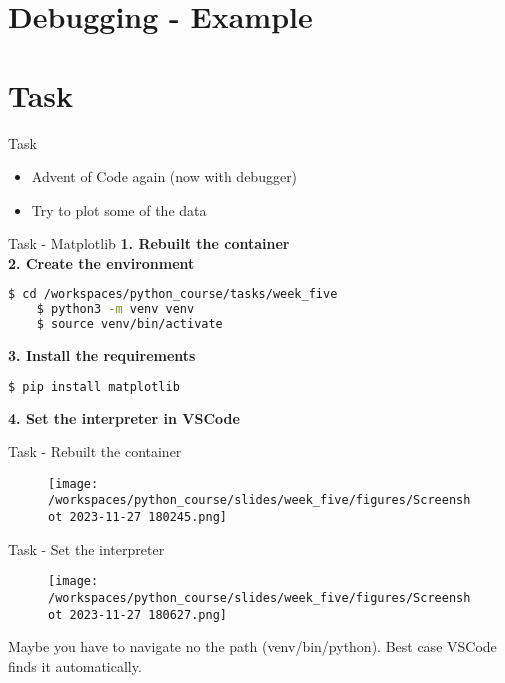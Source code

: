 \documentclass{beamer}
\begin{document}
\section{Debugging - Example}

\section{Task}

\begin{frame}{Task}
    \begin{itemize}
        \item  Advent of Code again (now with debugger)
        \item  Try to plot some of the data
    \end{itemize}
    
\end{frame}

\begin{frame}[fragile]{Task - Matplotlib}
    \textbf{1. Rebuilt the container}\\
    \textbf{2. Create the environment}
    \begin{lstlisting}[language=bash, backgroundcolor = \color{lightgray}, columns=fullflexible,
        breaklines=true]
    $ cd /workspaces/python_course/tasks/week_five
    $ python3 -m venv venv
    $ source venv/bin/activate
    \end{lstlisting}
    \textbf{3. Install the requirements}
    \begin{lstlisting}[language=bash, backgroundcolor = \color{lightgray}, columns=fullflexible,
        breaklines=true]
    $ pip install matplotlib
    \end{lstlisting}
    \textbf{4. Set the interpreter in VSCode}

\end{frame}

\begin{frame}{Task - Rebuilt the container}
    \begin{figure}
        \centering
        \texttt{[image: /workspaces/python\_course/slides/week\_five/figures/Screenshot 2023-11-27 180245.png]}
    \end{figure}
\end{frame}

\begin{frame}{Task - Set the interpreter}
    \begin{figure}
        \centering
        \texttt{[image: /workspaces/python\_course/slides/week\_five/figures/Screenshot 2023-11-27 180627.png]}
    \end{figure}
    Maybe you have to navigate no the path (venv/bin/python). Best case VSCode finds it automatically.
\end{frame}
\end{document}
